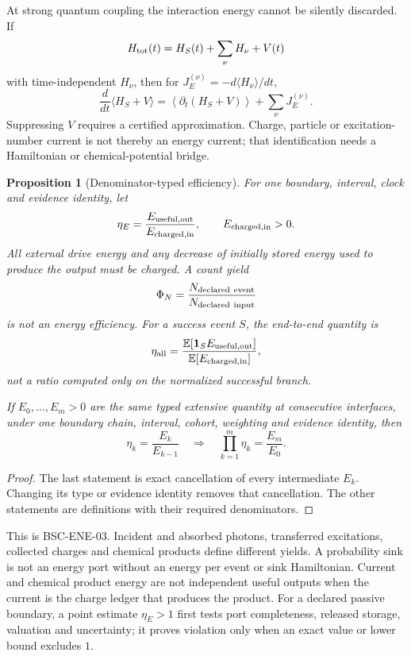 \documentclass[11pt,a4paper]{article}
\theoremstyle{definition}
\theoremstyle{plain}
\newtheorem{proposition}[definition]{Proposition}
\theoremstyle{remark}
\newcommand{\E}{\mathbb E}
\begin{document}
At strong quantum coupling the interaction energy cannot be silently
discarded.  If
\[
H_{\rm tot}(t)=H_S(t)+\sum_\nu H_\nu+V(t)
\]
with time-independent \(H_\nu\), then for
\(J_E^{(\nu)}=-d\langle H_\nu\rangle/dt\),
\[
\frac d{dt}\langle H_S+V\rangle
=
\left\langle\partial_t(H_S+V)\right\rangle
+
\sum_\nu J_E^{(\nu)} .
\]
Suppressing \(V\) requires a certified approximation.  Charge, particle or
excitation-number current is not thereby an energy current; that
identification needs a Hamiltonian or chemical-potential bridge.

\begin{proposition}[Denominator-typed efficiency]
\label{prop:typed-efficiency}
For one boundary, interval, clock and evidence identity, let
\[
\eta_E
=
\frac{E_{\rm useful,out}}{E_{\rm charged,in}},
\qquad E_{\rm charged,in}>0.
\]
All external drive energy and any decrease of initially stored energy used to
produce the output must be charged.  A count yield
\[
\Phi_N
=
\frac{N_{\rm declared\ event}}{N_{\rm declared\ input}}
\]
is not an energy efficiency.  For a success event \(S\), the end-to-end
quantity is
\[
\eta_{\rm all}
=
\frac{\E[\mathbf 1_SE_{\rm useful,out}]}
{\E[E_{\rm charged,in}]},
\]
not a ratio computed only on the normalized successful branch.

If \(E_0,\ldots,E_m>0\) are the same typed extensive quantity at consecutive
interfaces, under one boundary chain, interval, cohort, weighting and
evidence identity, then
\[
\eta_k=\frac{E_k}{E_{k-1}}
\quad\Longrightarrow\quad
\prod_{k=1}^m\eta_k=\frac{E_m}{E_0}.
\]
\end{proposition}
\begin{proof}
The last statement is exact cancellation of every intermediate \(E_k\).
Changing its type or evidence identity removes that cancellation.  The other
statements are definitions with their required denominators.
\end{proof}

This is BSC-ENE-03.  Incident and absorbed photons, transferred excitations,
collected charges and chemical products define different yields.  A
probability sink is not an energy port without an energy per event or sink
Hamiltonian.  Current and chemical product energy are not independent useful
outputs when the current is the charge ledger that produces the product.
For a declared passive boundary, a point estimate \(\eta_E>1\) first tests
port completeness, released storage, valuation and uncertainty; it proves
violation only when an exact value or lower bound excludes \(1\).
\end{document}
